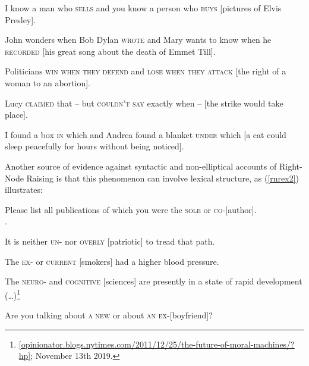 \documentclass[output=paper]{langsci/langscibook}
\begin{document}
\begin{exe}
\ex
\begin{xlista}
\ex  I know a man who \textsc{sells} and you know a person who \textsc{buys}
                     [pictures of Elvis Presley].

\ex John wonders when Bob Dylan
\textsc{wrote} and Mary wants to know when
  he
\textsc{recorded} [his great song about the death of Emmet Till].
 
 \ex Politicians \textsc{win when they defend} and \textsc{lose when they attack}
[the right of a woman to an abortion].

\ex Lucy \textsc{claimed} that -- but \textsc{couldn't say}
exactly when --  $[$the strike would take place$]$.
 
 \ex I found a box \textsc{in} which and Andrea found a blanket \textsc{under}
which [a cat could sleep peacefully for hours without being
noticed].
\end{xlista}\label{rnrex1}
\end{exe}

Another source of evidence against syntactic and non-elliptical accounts of Right-Node Raising is that this phenomenon can involve lexical structure,
as  (\ref{rnrex2}) illustrates:


\begin{exe}
\ex \begin{xlista}
\ex Please list all publications of which you were the \textsc{sole} or
\textsc{co}-[author].\\
 \citep[1325, footnote 44]{rodney2}.
 
\ex  It is neither \textsc{un}- nor \textsc{overly} [patriotic] to tread that path.
 
\ex The \textsc{ex-} or \textsc{current} [smokers] had a higher blood pressure.\\
\citep{chaveslp} 

\ex The \textsc{neuro}- and \textsc{cognitive} [sciences] are
presently in a state of rapid development (\ldots{})\footnote{\url{[opinionator.blogs.nytimes.com/2011/12/25/the-future-of-moral-machines/?hp]}; November 13th 2019.}

\ex Are you talking about \textsc{a new}  or about \textsc{an ex}-[boyfriend]?

\end{xlista}\label{rnrex2}
\end{exe}
\end{document}
